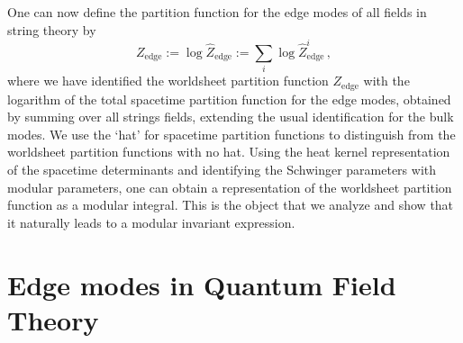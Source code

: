 \documentclass[aps,prl, reprint, superscriptaddress, 10pt]{revtex4-2}
\newcommand{\1}{\textbf{1}}
\newcommand{\+}{{\,+ \,}}
\begin{document}
One can now define the partition function for the edge modes of all fields in string theory by
 \begin{equation}\label{EdgeWS}
	Z_{\text{edge}} := \log \hat Z_{\text{edge}} := \sum_i \log \hat Z^i_{\text{edge}} \, ,
 \end{equation}
where we have identified the worldsheet partition function $Z_{\text{edge}}$ with the logarithm of the total spacetime partition function for the edge modes, obtained by summing over all strings fields, extending the usual identification for the bulk modes. We use the `hat' for spacetime partition functions to distinguish from the worldsheet partition functions with no hat. Using the heat kernel representation of the spacetime determinants and identifying the Schwinger parameters with modular parameters, one can obtain a representation of the worldsheet partition function as a modular integral. This is the object that we analyze and show that it naturally leads to a modular invariant expression.

\section{Edge modes in Quantum Field Theory}\label{sec:edge-review}
\end{document}
